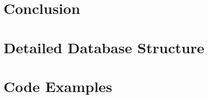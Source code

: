 \documentclass[draft,final]{vutinfth} %
\begin{document}
    \chapter{Conclusion}\label{ch:conclusion}
    
    

    \appendix

    \chapter{Detailed Database Structure}\label{ch:database-structure}
    

    \chapter{Code Examples}\label{ch:code-examples}
    

    \backmatter

    \listoffigures %

    \cleardoublepage %

    
    
\end{document}
